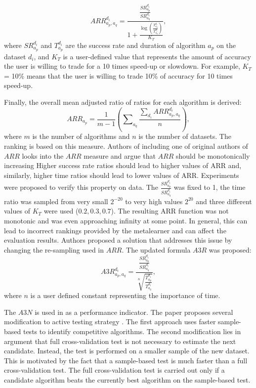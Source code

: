 \begin{equation}
{ARR}_{a_p,a_q}^{d_i}=\frac{\frac{SR_{a_p}^{d_i}}{SR_{a_q}^{d_i}}}{1+\frac{\log{\left(\frac{T_{a_p}^{d_i}}{T_{a_q}^{d_i}}\right)}}{K_T}},
\end{equation}
where $SR_{a_p}^{d_i}$ and $T_{a_p}^{d_i}$ are the success rate and duration of algorithm $a_p$ on the dataset $d_i$, and $K_T$ is a user-defined value that represents the amount of accuracy the user is willing to trade for a 10 times speed-up or slowdown. For example, $K_T$ = 10\% means that the user is willing to trade 10\% of accuracy for 10 times speed-up. 

Finally, the overall mean adjusted ratio of ratios for each algorithm is derived:
\begin{equation}
{ARR}_{a_p}=\frac{1}{m-1}\left(\sum\nolimits_{a_q} \frac{\sum\nolimits_{d_i} {{ARR}_{a_p,a_q}^{d_i}}}{n} \right),
\end{equation}
where $m$ is the number of algorithms and $n$ is the number of datasets. The ranking is based on this measure.
Authors of \cite{brazdilArrCorrected} including one of original authors of $ARR$ looks into the $ARR$ measure and argue that $ARR$ should be monotonically increasing Higher success rate ratios should lead to higher values of ARR and, similarly, higher time ratios should lead to lower values of ARR. Experiments were proposed to verify this property on data. The $\frac{SR_{a_p}^{d_i}}{SR_{a_q}^{d_i}}$ was fixed to 1, the time ratio was sampled from very small $2^{-20}$ to very high values $2^{20}$ and three different values of $K_T$ were used ($0.2, 0.3, 0.7$). The resulting ARR function was not monotonic and was even approaching infinity at some point. In general, this can lead to incorrect rankings provided by the metalearner and can affect the evaluation results. Authors proposed a solution that addresses this issue by changing the re-sampling used in $ARR$. The updated formula $A3R$ was proposed:
\begin{equation}
{A3R}_{a_p,a_q}^{d_i}=\frac{\frac{SR_{a_p}^{d_i}}{SR_{a_q}^{d_i}}}{\sqrt[n]{\frac{T_{a_p}^{d_i}}{T_{a_q}^{d_i}}}},
\end{equation}
where $n$ is a user defined constant representing the importance of time.

The $A3N$ is used in \cite{brazdil_a3rExperiments} as a performance indicator. The paper proposes several modification to active testing strategy \cite{activeTesting}. The first approach uses faster sample-based tests to identify competitive algorithms. The second modification lies in argument that full cross-validation test is not necessary to estimate the next candidate. Instead, the test is performed on a smaller sample of the new dataset. This is motivated by the fact that a sample-based test is much faster than a full cross-validation test. The full cross-validation test is carried out only if a candidate algorithm beats the currently best algorithm on the sample-based test.

